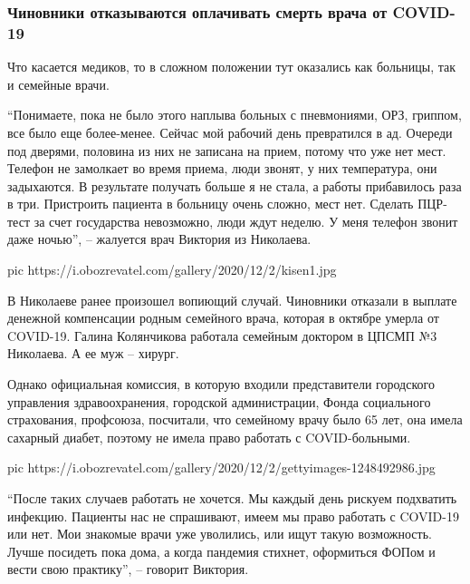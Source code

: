 \subsubsection{Чиновники отказываются оплачивать смерть врача от COVID-19}

Что касается медиков, то в сложном положении тут оказались как больницы, так и
семейные врачи.

\enquote{Понимаете, пока не было этого наплыва больных с пневмониями, ОРЗ, гриппом, все
было еще более-менее. Сейчас мой рабочий день превратился в ад. Очереди под
дверями, половина из них не записана на прием, потому что уже нет мест. Телефон
не замолкает во время приема, люди звонят, у них температура, они задыхаются. В
результате получать больше я не стала, а работы прибавилось раза в три.
Пристроить пациента в больницу очень сложно, мест нет. Сделать ПЦР-тест за счет
государства невозможно, люди ждут неделю. У меня телефон звонит даже ночью}, –
жалуется врач Виктория из Николаева.

\ifcmt
pic https://i.obozrevatel.com/gallery/2020/12/2/kisen1.jpg
\fi

В Николаеве ранее произошел вопиющий случай. Чиновники отказали в выплате
денежной компенсации родным семейного врача, которая в октябре умерла от
COVID-19. Галина Колянчикова работала семейным доктором в ЦПСМП №3 Николаева. А
ее муж – хирург.

Однако официальная комиссия, в которую входили представители городского
управления здравоохранения, городской администрации, Фонда социального
страхования, профсоюза, посчитали, что семейному врачу было 65 лет, она имела
сахарный диабет, поэтому не имела право работать с COVID-больными.

\ifcmt
pic https://i.obozrevatel.com/gallery/2020/12/2/gettyimages-1248492986.jpg
\fi

\enquote{После таких случаев работать не хочется. Мы каждый день рискуем
подхватить инфекцию. Пациенты нас не спрашивают, имеем мы право работать с
COVID-19 или нет. Мои знакомые врачи уже уволились, или ищут такую возможность.
Лучше посидеть пока дома, а когда пандемия стихнет, оформиться ФОПом и вести
свою практику}, – говорит Виктория.

